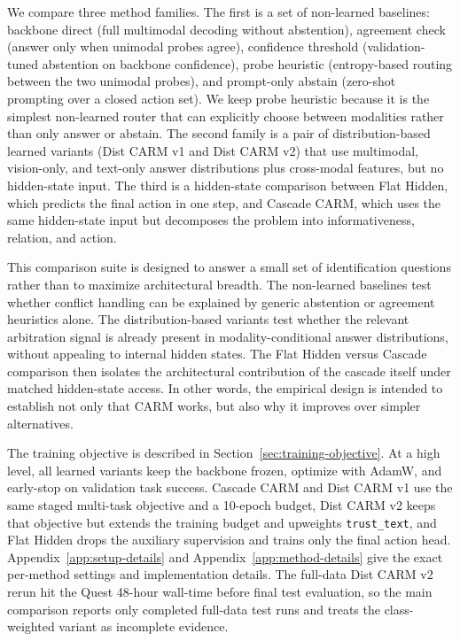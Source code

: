 \documentclass[11pt]{article}
\begin{document}
We compare three method families. The first is a set of non-learned baselines:
backbone direct (full multimodal decoding without abstention), agreement check (answer
only when unimodal probes agree), confidence threshold (validation-tuned abstention on
backbone confidence), probe heuristic (entropy-based routing between the two unimodal
probes), and prompt-only abstain (zero-shot prompting over a closed action set). We keep
probe heuristic because it is the simplest non-learned router that can explicitly choose
between modalities rather than only answer or abstain. The second family is a pair of
distribution-based learned variants (Dist CARM v1 and Dist CARM v2) that use multimodal,
vision-only, and text-only answer distributions plus cross-modal features, but no
hidden-state input. The third is a hidden-state comparison between Flat Hidden, which
predicts the final action in one step, and Cascade CARM, which uses the same hidden-state
input but decomposes the problem into informativeness, relation, and action.

This comparison suite is designed to answer a small set of identification questions rather
than to maximize architectural breadth. The non-learned baselines test whether conflict
handling can be explained by generic abstention or agreement heuristics alone. The
distribution-based variants test whether the relevant arbitration signal is already present
in modality-conditional answer distributions, without appealing to internal hidden states.
The Flat Hidden versus Cascade comparison then isolates the architectural contribution of
the cascade itself under matched hidden-state access. In other words, the empirical design
is intended to establish not only that CARM works, but also why it improves over simpler
alternatives.

The training objective is described in Section~\ref{sec:training-objective}. At a high
level, all learned variants keep the backbone frozen, optimize with AdamW, and early-stop on
validation task success. Cascade CARM and Dist CARM v1 use the same staged multi-task
objective and a 10-epoch budget, Dist CARM v2 keeps that objective but extends the training
budget and upweights \texttt{trust\_text}, and Flat Hidden drops the auxiliary supervision
and trains only the final action head. Appendix~\ref{app:setup-details} and
Appendix~\ref{app:method-details} give the exact per-method settings and implementation
details. The full-data Dist CARM v2 rerun hit the Quest 48-hour wall-time before final test
evaluation, so the main comparison reports only completed full-data test runs and treats the
class-weighted variant as incomplete evidence.
\end{document}
